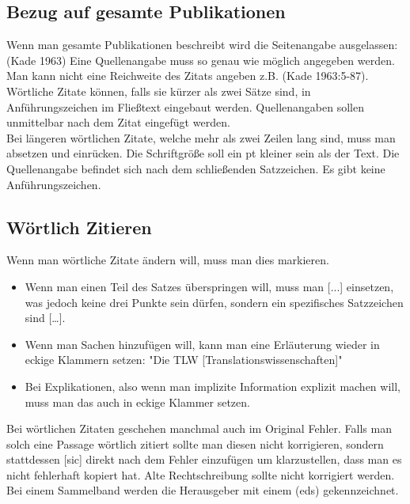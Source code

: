 \documentclass{article}
\begin{document}
	\subsection{Bezug auf gesamte Publikationen}
	Wenn man gesamte Publikationen beschreibt wird die Seitenangabe ausgelassen: (Kade 1963) Eine Quellenangabe muss so genau wie möglich angegeben werden. Man kann nicht eine Reichweite des Zitats angeben z.B. (Kade 1963:5-87).\\
	Wörtliche Zitate können, falls sie kürzer als zwei Sätze sind, in Anführungszeichen im Fließtext eingebaut werden. Quellenangaben sollen unmittelbar nach dem Zitat eingefügt werden. \\
	Bei längeren wörtlichen Zitate, welche mehr als zwei Zeilen lang sind, muss man absetzen und einrücken. Die Schriftgröße soll ein pt kleiner sein als der Text. Die Quellenangabe befindet sich nach dem schließenden Satzzeichen. Es gibt keine Anführungszeichen. \\
	\subsection{Wörtlich Zitieren}
	Wenn man wörtliche Zitate ändern will, muss man dies markieren. 
	\begin{itemize}
		\item{Wenn man einen Teil des Satzes überspringen will, muss man [...] einsetzen, was jedoch keine drei Punkte sein dürfen, sondern ein spezifisches Satzzeichen sind [\dots].}
		\item{Wenn man Sachen hinzufügen will, kann man eine Erläuterung wieder in eckige Klammern setzen: "Die TLW [Translationswissenschaften]"}
		\item{Bei Explikationen, also wenn man implizite Information explizit machen will, muss man das auch in eckige Klammer setzen.}
	\end{itemize}

	Bei wörtlichen Zitaten geschehen manchmal auch im Original Fehler. Falls man solch eine Passage wörtlich zitiert sollte man diesen nicht korrigieren, sondern stattdessen [sic] direkt nach dem Fehler einzufügen um klarzustellen, dass man es nicht fehlerhaft kopiert hat. Alte Rechtschreibung sollte nicht korrigiert werden. \\


	Bei einem Sammelband werden die Herausgeber mit einem (eds) gekennzeichnet.
\end{document}
